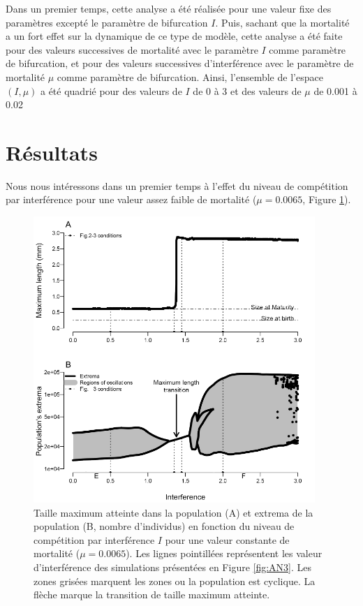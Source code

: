 Dans un premier temps, cette analyse a été réalisée pour une valeur fixe des
paramètres excepté le paramètre de bifurcation $I$. Puis, sachant que la
mortalité a un fort effet sur la dynamique de ce type de modèle, cette analyse
a été faite pour des valeurs successives de mortalité avec le paramètre $I$
comme paramètre de bifurcation, et pour des valeurs successives d'interférence
avec le paramètre de mortalité $\mu$ comme paramètre de bifurcation. Ainsi,
l'ensemble de l'espace $(I,\mu)$ a été quadrié pour des valeurs de $I$ de 0 à 3
et des valeurs de $\mu$ de 0.001 à 0.02

\section{Résultats}

Nous nous intéressons dans un premier temps à l'effet du niveau de compétition
par interférence pour une valeur assez faible de mortalité ($\mu = 0.0065$,
Figure \ref{fig:AN2}). 

\begin{figure}[!ht]
\begin{center}
\includegraphics[width=0.95\textwidth]{1_CorpsDeThese/Resumes/Fig/AN02}
\caption[Bifurcation sur le
niveau d'interférence]{Taille maximum atteinte dans la population (A) et extrema
de la population (B, nombre d'individus) en fonction du niveau de compétition par interférence $I$ pour une
valeur constante de mortalité ($\mu = 0.0065$). Les lignes pointillées
représentent les valeur d'interférence des simulations présentées en Figure
\ref{fig:AN3}. Les zones grisées marquent les zones ou la population est
cyclique. La flèche marque la transition de taille maximum atteinte.}
\label{fig:AN2}
\end{center}
\end{figure}

